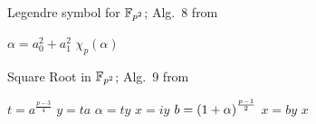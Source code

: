 \begin{algorithm}[tp]
\caption{Legendre symbol for $\mathbb{F}_{p^{2}}$; Alg.~8
    from~\cite{adj2012sqrtEvenExt}}
\label{alg:legendre-fp2}
\begin{algorithmic}[1]
    \State $\alpha = a_{0}^{2} + a_{1}^{2}$
    \State \Return $\chi_{p}(\alpha)$
\EndFunction
\end{algorithmic}
\end{algorithm}

\begin{algorithm}[tp]
\caption{Square Root in $\mathbb{F}_{p^{2}}$; Alg.~9
    from~\cite{adj2012sqrtEvenExt}}
\label{alg:sqrt-fp2}
\begin{algorithmic}[1]
    \State $t = a^{\frac{p-3}{4}}$
    \State $y = ta$
    \State $\alpha = ty$
        \State $x = iy$
    \Else
        \State $b = \left( 1+\alpha \right)^{\frac{p-1}{2}}$
        \State $x = by$
    \EndIf
    \State \Return $x$
\EndFunction
\end{algorithmic}
\end{algorithm}
